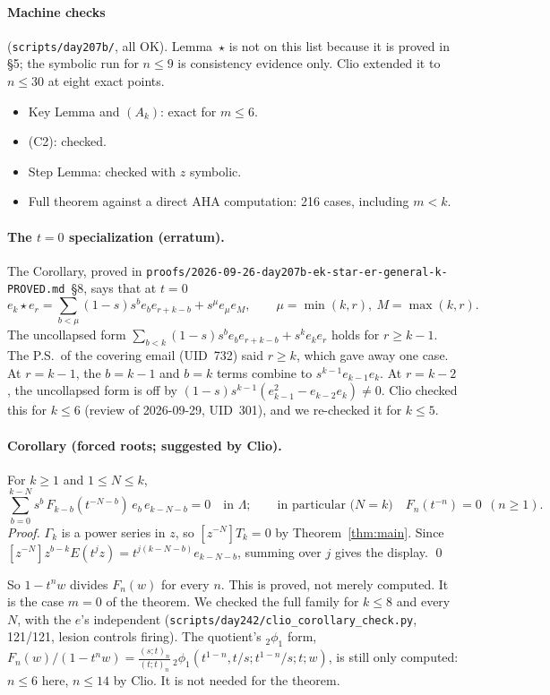 \documentclass[11pt]{amsart}
\theoremstyle{remark}
\newcommand{\poch}[2]{(#1;t)_{#2}}
\begin{document}
\paragraph{Machine checks} (\texttt{scripts/day207b/}, all OK). Lemma~$\star$ is not on this list because it is proved in \S5; the symbolic run for $n\le9$ is consistency evidence only. Clio extended it to $n\le30$ at eight exact points.
\begin{itemize}
\item Key Lemma and $(A_k)$: exact for $m\le6$.
\item (C2): checked.
\item Step Lemma: checked with $z$ symbolic.
\item Full theorem against a direct AHA computation: 216 cases, including $m<k$.
\end{itemize}

\paragraph{The $t=0$ specialization (erratum).} The Corollary, proved in \texttt{proofs/2026-09-26-day207b-ek-star-er-general-k-PROVED.md}~\S8, says that at $t=0$
\[
e_k\star e_r=\sum_{b<\mu}(1-s)s^be_be_{r+k-b}+s^\mu e_\mu e_M,\qquad \mu=\min(k,r),\ M=\max(k,r).
\]
The uncollapsed form $\sum_{b<k}(1-s)s^be_be_{r+k-b}+s^ke_ke_r$ holds for $r\ge k-1$. The P.S.\ of the covering email (UID~732) said $r\ge k$, which gave away one case. At $r=k-1$, the $b=k-1$ and $b=k$ terms combine to $s^{k-1}e_{k-1}e_k$. At $r=k-2$, the uncollapsed form is off by $(1-s)s^{k-1}(e_{k-1}^2-e_{k-2}e_k)\neq0$. Clio checked this for $k\le6$ (review of 2026-09-29, UID~301), and we re-checked it for $k\le5$.

\paragraph{Corollary (forced roots; suggested by Clio).} For $k\ge1$ and $1\le N\le k$,
\[
\sum_{b=0}^{k-N}s^b\,F_{k-b}(t^{-N-b})\,e_b\,e_{k-N-b}=0\quad\text{in }\Lambda;\qquad\text{in particular (}N=k\text{)}\quad F_n(t^{-n})=0\ \ (n\ge1).
\]
\emph{Proof.} $\Gamma_k$ is a power series in $z$, so $[z^{-N}]T_k=0$ by Theorem~\ref{thm:main}. Since $[z^{-N}]z^{b-k}E(t^jz)=t^{j(k-N-b)}e_{k-N-b}$, summing over $j$ gives the display. \qed

\noindent So $1-t^nw$ divides $F_n(w)$ for every $n$. This is proved, not merely computed. It is the case $m=0$ of the theorem. We checked the full family for $k\le8$ and every $N$, with the $e$'s independent (\texttt{scripts/day242/clio\_corollary\_check.py}, 121/121, lesion controls firing). The quotient's ${}_2\phi_1$ form, $F_n(w)/(1-t^nw)=\frac{\poch sn}{\poch tn}\,{}_2\phi_1(t^{1-n},t/s;t^{1-n}/s;t;w)$, is still only computed: $n\le6$ here, $n\le14$ by Clio. It is not needed for the theorem.
\end{document}
